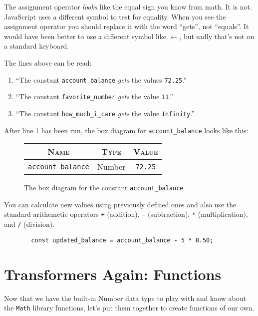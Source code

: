 \documentclass{amsart}
\begin{document}
The assignment operator \textit{looks} like the equal sign you know from math. It is not. JavaScript uses a different symbol to test for equality. When you see the assignment operator you should replace it with the word ``gets'', not ``equals''. It would have been better to use a different symbol like $\leftarrow$, but sadly that's not on a standard keyboard.

The lines above can be read:
\begin{enumerate}
  \item ``The constant \texttt{account\_balance} \emph{gets} the values \texttt{72.25}.''
  \item ``The constant \texttt{favorite\_number} \emph{gets} the value \texttt{11}.''
  \item ``The constant \texttt{how\_much\_i\_care} \emph{gets} the value \texttt{Infinity}.''
\end{enumerate}

After line 1 has been run, the box diagram for \texttt{account\_balance} looks like this:

\begin{figure}[h]
  \color{cyan}
\begin{tabular}{|c|c|c|}
  \hline
  \textsc{Name} & \textsc{Type} & \textsc{Value}\\
  \hline
  \texttt{account\_balance} & \textsf{Number} & \texttt{72.25}\\
  \hline
\end{tabular}
\caption{The box diagram for the constant \texttt{account\_balance}}
\end{figure}

You can calculate new values using previously defined ones and also use the standard arithemetic operators {\color{cyan}\texttt{+}} (addition), {\color{cyan}\texttt{-}} (subtraction), {\color{cyan}\texttt{*}} (multiplication), and {\color{cyan}\texttt{/}} (division).

\begin{figure}[h]
  \begin{lstlisting}
  const updated_balance = account_balance - 5 * 8.50;
  \end{lstlisting}
\end{figure}

\section{Transformers Again: Functions}

Now that we have the built-in \textsf{Number} data type to play with and know about the \texttt{Math} library functions, let's put them together to create functions of our own.
\end{document}

